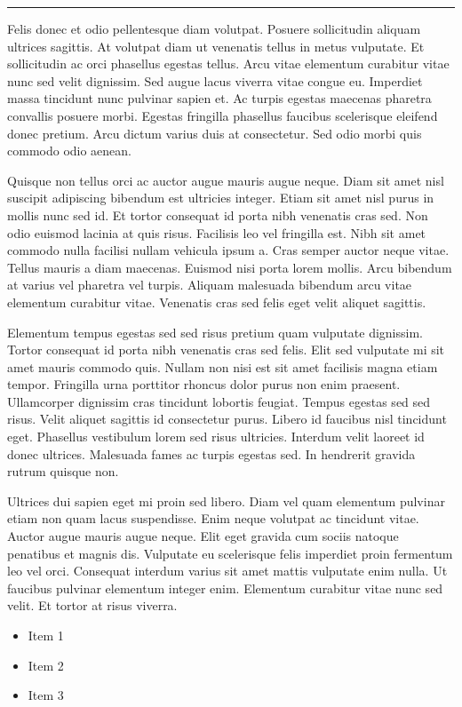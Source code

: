 \documentclass[10pt]{article}
\newenvironment{BoxedInternal}[1][]
{%
  \begin{changemargin}{0cm}{0cm}%
    \begin{mdframed}[roundcorner=5pt,backgroundcolor=swred,outermargin  =-0.5in,innermargin =-0.5in, topline=false, bottomline=false, rightline=false, leftline=false,#1]
    }{%
    \end{mdframed}%
  \end{changemargin}%
}
\newcommand*{\noind}{\setlength{\parindent}{0cm}} %
\newcommand{\bighdr}[2][]{%
  \begin{BoxedInternal}[#1]{}
    \color{white}\huge\bfseries\headingfont\filcenter{#2}
  \end{BoxedInternal}%
}
\newcommand{\medhdr}[1][]{%
	{\noind{\Large\bfseries\headingfont{#1}}}
	\vspace{-9pt}%

	\noindent\rule{2.75in}{2pt} %
}
\begin{document}
\begin{multicols}{2}
\medhdr[ANOTHER SMALL SECTION]
{\noind
Felis donec et odio pellentesque diam volutpat. Posuere sollicitudin aliquam ultrices sagittis. At volutpat diam ut venenatis tellus in metus vulputate. Et sollicitudin ac orci phasellus egestas tellus. Arcu vitae elementum curabitur vitae nunc sed velit dignissim. Sed augue lacus viverra vitae congue eu. Imperdiet massa tincidunt nunc pulvinar sapien et. Ac turpis egestas maecenas pharetra convallis posuere morbi. Egestas fringilla phasellus faucibus scelerisque eleifend donec pretium. Arcu dictum varius duis at consectetur. Sed odio morbi quis commodo odio aenean.
}

Quisque non tellus orci ac auctor augue mauris augue neque. Diam sit amet nisl suscipit adipiscing bibendum est ultricies integer. Etiam sit amet nisl purus in mollis nunc sed id. Et tortor consequat id porta nibh venenatis cras sed. Non odio euismod lacinia at quis risus. Facilisis leo vel fringilla est. Nibh sit amet commodo nulla facilisi nullam vehicula ipsum a. Cras semper auctor neque vitae. Tellus mauris a diam maecenas. Euismod nisi porta lorem mollis. Arcu bibendum at varius vel pharetra vel turpis. Aliquam malesuada bibendum arcu vitae elementum curabitur vitae. Venenatis cras sed felis eget velit aliquet sagittis.

\bighdr{OTHER STUFF}
{\noind
Elementum tempus egestas sed sed risus pretium quam vulputate dignissim. Tortor consequat id porta nibh venenatis cras sed felis. Elit sed vulputate mi sit amet mauris commodo quis. Nullam non nisi est sit amet facilisis magna etiam tempor. Fringilla urna porttitor rhoncus dolor purus non enim praesent. Ullamcorper dignissim cras tincidunt lobortis feugiat. Tempus egestas sed sed risus. Velit aliquet sagittis id consectetur purus. Libero id faucibus nisl tincidunt eget. Phasellus vestibulum lorem sed risus ultricies. Interdum velit laoreet id donec ultrices. Malesuada fames ac turpis egestas sed. In hendrerit gravida rutrum quisque non.
}

Ultrices dui sapien eget mi proin sed libero. Diam vel quam elementum pulvinar etiam non quam lacus suspendisse. Enim neque volutpat ac tincidunt vitae. Auctor augue mauris augue neque. Elit eget gravida cum sociis natoque penatibus et magnis dis. Vulputate eu scelerisque felis imperdiet proin fermentum leo vel orci. Consequat interdum varius sit amet mattis vulputate enim nulla. Ut faucibus pulvinar elementum integer enim. Elementum curabitur vitae nunc sed velit. Et tortor at risus viverra.

\begin{itemize}
\item Item 1
\item Item 2
\item Item 3
\end{itemize}


\end{multicols}
\end{document}
